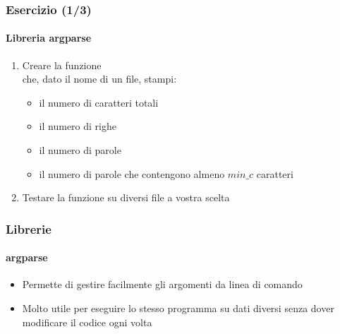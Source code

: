 \begin{exerciseframe}
    \frametitle{Esercizio (1/3)}
    \framesubtitle{Libreria argparse}

    \begin{enumerate}
        \item Creare la funzione \\che, dato il nome di un file, stampi:
        \begin{itemize}
            \item il numero di caratteri totali
            \item il numero di righe
            \item il numero di parole
            \item il numero di parole che contengono almeno $min\_c$ caratteri
        \end{itemize}

        \bigskip
        \item Testare la funzione su diversi file a vostra scelta
    \end{enumerate}
\end{exerciseframe}

\begin{contentframe}
    \frametitle{Librerie}
    \framesubtitle{argparse}

    \begin{itemize}
        \item Permette di gestire facilmente gli argomenti da linea di comando

        \bigskip
        \item Molto utile per eseguire lo stesso programma su dati diversi senza dover modificare il codice ogni volta
    \end{itemize}
\end{contentframe}

